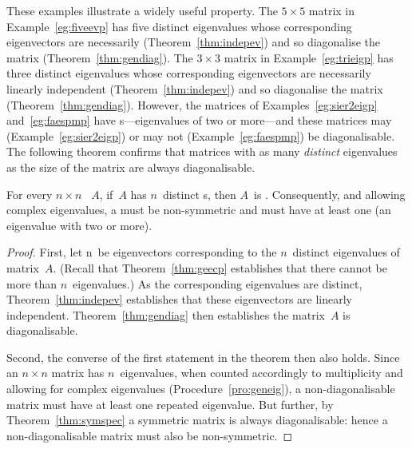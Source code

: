 These examples illustrate a widely useful property.
The \(5\times 5\) matrix in Example~\ref{eg:fiveevp} has five distinct eigenvalues whose corresponding eigenvectors are necessarily  (Theorem~\ref{thm:indepev}) and so diagonalise the matrix (Theorem~\ref{thm:gendiag}).
The \(3\times 3\) matrix in Example~\ref{eg:trieigp} has three distinct eigenvalues whose corresponding eigenvectors are necessarily linearly independent (Theorem~\ref{thm:indepev}) and so diagonalise the matrix (Theorem~\ref{thm:gendiag}).
However, the matrices of Examples~\ref{eg:sier2eigp} and~\ref{eg:faespmp} have s---eigenvalues of  two or more---and these matrices may (Example~\ref{eg:sier2eigp}) or may not (Example~\ref{eg:faespmp}) be diagonalisable.
The following theorem confirms that matrices with as many \emph{distinct} eigenvalues as the size of the matrix are always diagonalisable.






\begin{theorem} \label{thm:dlamd} 
For every \(n\times n\) ~\(A\), if~\(A\) has \(n\)~distinct s, then \(A\)~is .
Consequently, and allowing complex eigenvalues, a  must be non-symmetric and must have at least one  (an eigenvalue with  two or more).
\end{theorem}
\begin{proof}  
First, let \hlist\vv n\ be eigenvectors corresponding to the \(n\)~distinct eigenvalues of matrix~\(A\).
(Recall that Theorem~\ref{thm:geecp} establishes that there cannot be more than \(n\)~eigenvalues.)
As the corresponding eigenvalues are distinct, Theorem~\ref{thm:indepev} establishes that these eigenvectors are linearly independent.
Theorem~\ref{thm:gendiag} then establishes the matrix~\(A\) is diagonalisable.

Second, the converse of the first statement in the theorem then also holds.
Since an \(n\times n\) matrix has \(n\)~eigenvalues, when counted accordingly to multiplicity and allowing for complex eigenvalues (Procedure~\ref{pro:geneig}), a non-diagonalisable matrix must have at least one repeated eigenvalue.  
But further, by Theorem~\ref{thm:symspec} a symmetric matrix is always diagonalisable: hence a non-diagonalisable matrix must also be non-symmetric.
\end{proof}


